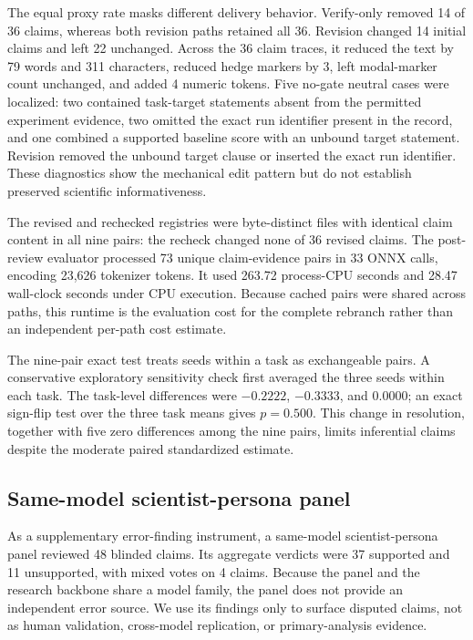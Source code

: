 \documentclass[11pt]{article}
\begin{document}
The equal proxy rate masks different delivery behavior. Verify-only removed 14 of 36 claims, whereas both revision paths retained all 36. Revision changed 14 initial claims and left 22 unchanged. Across the 36 claim traces, it reduced the text by 79 words and 311 characters, reduced hedge markers by 3, left modal-marker count unchanged, and added 4 numeric tokens. Five no-gate neutral cases were localized: two contained task-target statements absent from the permitted experiment evidence, two omitted the exact run identifier present in the record, and one combined a supported baseline score with an unbound target statement. Revision removed the unbound target clause or inserted the exact run identifier. These diagnostics show the mechanical edit pattern but do not establish preserved scientific informativeness.

The revised and rechecked registries were byte-distinct files with identical claim content in all nine pairs: the recheck changed none of 36 revised claims. The post-review evaluator processed 73 unique claim-evidence pairs in 33 ONNX calls, encoding 23,626 tokenizer tokens. It used 263.72 process-CPU seconds and 28.47 wall-clock seconds under CPU execution. Because cached pairs were shared across paths, this runtime is the evaluation cost for the complete rebranch rather than an independent per-path cost estimate.

The nine-pair exact test treats seeds within a task as exchangeable pairs. A conservative exploratory sensitivity check first averaged the three seeds within each task. The task-level differences were $-0.2222$, $-0.3333$, and $0.0000$; an exact sign-flip test over the three task means gives $p=0.500$. This change in resolution, together with five zero differences among the nine pairs, limits inferential claims despite the moderate paired standardized estimate.

\subsection{Same-model scientist-persona panel}

As a supplementary error-finding instrument, a same-model scientist-persona panel reviewed 48 blinded claims. Its aggregate verdicts were 37 supported and 11 unsupported, with mixed votes on 4 claims. Because the panel and the research backbone share a model family, the panel does not provide an independent error source. We use its findings only to surface disputed claims, not as human validation, cross-model replication, or primary-analysis evidence.
\end{document}
